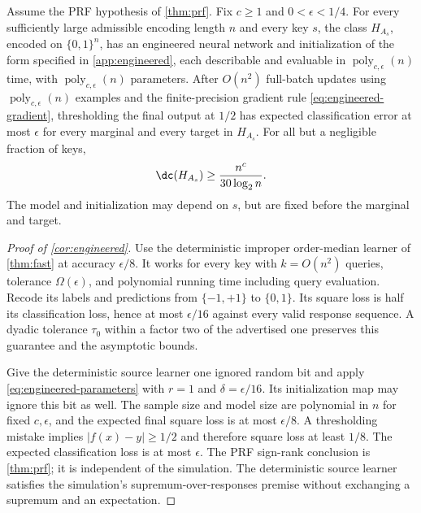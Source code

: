 \begin{corollary}\label{cor:engineered}
Assume the PRF hypothesis of \cref{thm:prf}. Fix $c\ge1$ and $0<\epsilon<1/4$. For every sufficiently large admissible encoding length $n$ and every key $s$, the class $H_{A_s}$, encoded on $\{0,1\}^n$, has an engineered neural network and initialization of the form specified in \cref{app:engineered}, each describable and evaluable in $\operatorname{poly}_{c,\epsilon}(n)$ time, with $\operatorname{poly}_{c,\epsilon}(n)$ parameters. After $O(n^2)$ full-batch updates using $\operatorname{poly}_{c,\epsilon}(n)$ examples and the finite-precision gradient rule \eqref{eq:engineered-gradient}, thresholding the final output at $1/2$ has expected classification error at most $\epsilon$ for every marginal and every target in $H_{A_s}$. For all but a negligible fraction of keys,
\[
 \dc(H_{A_s})\ge\frac{n^c}{30\log_2 n}.
\]
The model and initialization may depend on $s$, but are fixed before the marginal and target.
\end{corollary}

\begin{proof}[Proof of \cref{cor:engineered}]
Use the deterministic improper order-median learner of \cref{thm:fast} at accuracy $\epsilon/8$. It works for every key with $k=O(n^2)$ queries, tolerance $\Omega(\epsilon)$, and polynomial running time including query evaluation. Recode its labels and predictions from $\{-1,+1\}$ to $\{0,1\}$. Its square loss is half its classification loss, hence at most $\epsilon/16$ against every valid response sequence. A dyadic tolerance $\tau_0$ within a factor two of the advertised one preserves this guarantee and the asymptotic bounds.

Give the deterministic source learner one ignored random bit and apply \eqref{eq:engineered-parameters} with $r=1$ and $\delta=\epsilon/16$. Its initialization map may ignore this bit as well. The sample size and model size are polynomial in $n$ for fixed $c,\epsilon$, and the expected final square loss is at most $\epsilon/8$. A thresholding mistake implies $|f(x)-y|\ge1/2$ and therefore square loss at least $1/8$. The expected classification loss is at most $\epsilon$. The PRF sign-rank conclusion is \cref{thm:prf}; it is independent of the simulation. The deterministic source learner satisfies the simulation's supremum-over-responses premise without exchanging a supremum and an expectation.
\end{proof}
